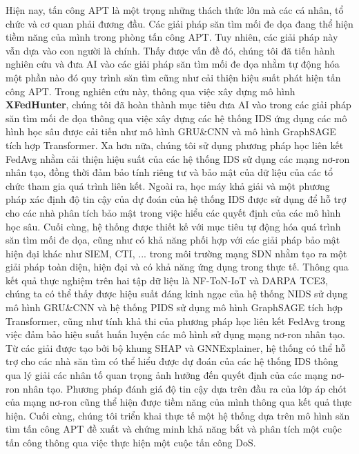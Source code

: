 Hiện nay, tấn công APT là một trọng những thách thức lớn mà các cá nhân, tổ chức và cơ quan phải đương đầu. Các giải pháp săn tìm mối đe dọa đang thể hiện tiềm năng của mình trong phòng tấn công APT. Tuy nhiên, các giải pháp này vẫn dựa vào con người là chính. Thấy được vấn đề đó, chúng tôi đã tiến hành nghiên cứu và đưa AI vào các giải pháp săn tìm mối đe dọa nhằm tự động hóa một phần nào đó quy trình săn tìm cũng như cải thiện hiệu suất phát hiện tấn công APT.
\bigbreak\noindent
Trong nghiên cứu này, thông qua việc xây dựng mô hình \textbf{XFedHunter}, chúng tôi đã hoàn thành mục tiêu đưa AI vào trong các giải pháp săn tìm mối đe dọa thông qua việc xây dựng các hệ thống IDS ứng dụng các mô hình học sâu được cải tiến như mô hình GRU\&CNN và mô hình GraphSAGE tích hợp Transformer. Xa hơn nữa, chúng tôi sử dụng phương pháp học liên kết FedAvg nhằm cải thiện hiệu suất của các hệ thống IDS sử dụng các mạng nơ-ron nhân tạo, đồng thời đảm bảo tính riêng tư và bảo mật của dữ liệu của các tổ chức tham gia quá trình liên kết. Ngoài ra, học máy khả giải và một phương pháp xác định độ tin cậy của dự đoán của hệ thống IDS được sử dụng để hỗ trợ cho các nhà phân tích bảo mật trong việc hiểu các quyết định của các mô hình học sâu. Cuối cùng, hệ thống được thiết kế với mục tiêu tự động hóa quá trình săn tìm mối đe dọa, cũng như có khả năng phối hợp với các giải pháp bảo mật hiện đại khác như SIEM, CTI, ... trong môi trường mạng SDN nhằm tạo ra một giải pháp toàn diện, hiện đại và có khả năng ứng dụng trong thực tế.
\bigbreak\noindent
Thông qua kết quả thực nghiệm trên hai tập dữ liệu là NF-ToN-IoT và DARPA TCE3, chúng ta có thể thấy được hiệu suất đáng kinh ngạc của hệ thống NIDS sử dụng mô hình GRU\&CNN và hệ thống PIDS sử dụng mô hình GraphSAGE tích hợp Transformer, cũng như tính khả thi của phương pháp học liên kết FedAvg trong việc đảm bảo hiệu suất huấn luyện các mô hình sử dụng mạng nơ-ron nhân tạo. Từ các giải được tạo bởi bộ khung SHAP và GNNExplainer, hệ thống có thể hỗ trợ cho các nhà săn tìm có thể hiểu được dự đoán của các hệ thống IDS thông qua lý giải các nhân tố quan trọng ảnh hưởng đến quyết định của các mạng nơ-ron nhân tạo. Phương pháp đánh giá độ tin cậy dựa trên đầu ra của lớp áp chót của mạng nơ-ron cũng thể hiện được tiềm năng của mình thông qua kết quả thực hiện. Cuối cùng, chúng tôi triển khai thực tế một hệ thống dựa trên mô hình săn tìm tấn công APT đề xuất và chứng minh khả năng bắt và phân tích một cuộc tấn công thông qua việc thực hiện một cuộc tấn công DoS.
\bigbreak\noindent
